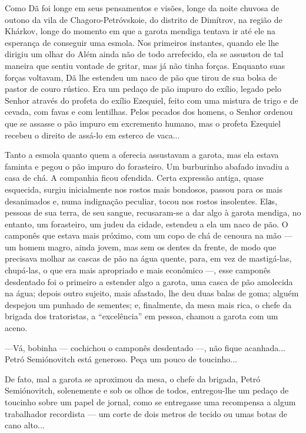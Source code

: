 Como Dã foi longe em seus pensamentos e visões, longe da noite chuvosa
de outono da vila de Chagoro-Petróvskoie, do distrito de Dimítrov, na
região de Khárkov, longe do momento em que a garota mendiga tentava ir
até ele na esperança de conseguir uma esmola. Nos primeiros instantes,
quando ele lhe dirigiu um olhar do Além ainda não de todo arrefecido,
ela se assustou de tal maneira que sentiu vontade de gritar, mas já não
tinha forças. Enquanto suas forças voltavam, Dã lhe estendeu um naco de
pão que tirou de sua bolsa de pastor de couro rústico. Era um pedaço de
pão impuro do exílio, legado pelo Senhor através do profeta do exílio
Ezequiel, feito com uma mistura de trigo e de cevada, com favas e com
lentilhas. Pelos pecados dos homens, o Senhor ordenou que se assasse o
pão impuro em excremento humano, mas o profeta Ezequiel recebeu o
direito de assá-lo em esterco de vaca...

Tanto a esmola quanto quem a oferecia assustavam a garota, mas ela
estava faminta e pegou o pão impuro do forasteiro. Um burburinho abafado
invadiu a casa de chá. A companhia ficou ofendida. Certa expressão
antiga, quase esquecida, surgiu inicialmente nos rostos mais bondosos,
passou para os mais desanimados e, numa indignação peculiar, tocou nos
rostos insolentes. Elаs, pessoas de sua terra, de seu sangue,
recusaram-se a dar algo à garota mendiga, no entanto, um forasteiro, um
judeu da cidade, estendeu a ela um naco de pão. O camponês que estava
mais próximo, com um copo de chá de cenoura na mão --- um homem magro,
ainda jovem, mas sem os dentes da frente, de modo que precisava molhar
as cascas de pão na água quente, para, em vez de mastigá-las, chupá-las,
o que era mais apropriado e mais econômico ---, esse camponês desdentado
foi o primeiro a estender algo a garota, uma casca de pão amolecida na
água; depois outro sujeito, mais afastado, lhe deu duas balas de goma;
alguém despejou um punhado de sementes; e, finalmente, da mesa mais
rica, o chefe da brigada dos tratoristas, a ``excelência'' em pessoa,
chamou a garota com um aceno.

---Vá, bobinha --- cochichou o camponês desdentado ---, não fique
acanhada... Petró Semiónovitch está generoso. Peça um pouco de
toucinho...

De fato, mal a garota se aproximou da mesa, o chefe da brigada, Petró
Semiónovitch, solenemente e sob os olhos de todos, entregou-lhe um
pedaço de toucinho sobre um papel de jornal, como se entregasse uma
recompensa a algum trabalhador recordista --- um corte de dois metros de
tecido ou umas botas de cano alto...

